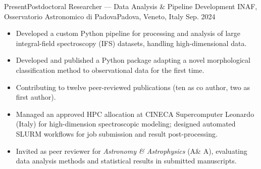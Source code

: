\begin{experiences}

\experience
  {Present}{Postdoctoral Researcher --- Data Analysis \& Pipeline Development}
  {INAF, Osservatorio Astronomico di Padova}{Padova, Veneto, Italy}
  {Sep. 2024}{
    \begin{itemize}
      \item Developed a custom Python pipeline for processing and analysis of large integral-field spectroscopy (IFS) datasets, handling high-dimensional data.
      \item Developed and published a Python package adapting a novel morphological classification method to observational data for the first time.
      \item Contributing to twelve peer-reviewed publications (ten as co author, two as first author).
      \item Managed an approved HPC allocation at CINECA Supercomputer Leonardo (Italy) for high-dimension spectroscopic modeling; designed automated SLURM workflows for job submission and result post-processing.
      \item Invited as peer reviewer for \textit{Astronomy \& Astrophysics} (A\& A), evaluating data analysis methods and statistical results in submitted manuscripts.
    \end{itemize}
  }{}

\end{experiences}